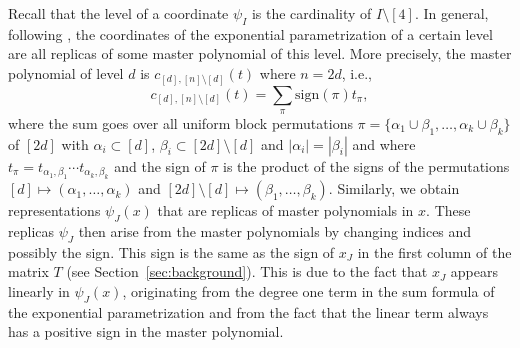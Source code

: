 \documentclass[11pt,reqno]{amsart}
\theoremstyle{definition}
\numberwithin{theorem}{section}
\newcommand{\sign}{\mathrm{sign}}
\numberwithin{equation}{section}
\begin{document}
Recall that the level of a coordinate $\psi_{I}$ is the cardinality of $I \setminus [4]$. In general, following \cite[Theorem 2.5]{faulstich2024algebraic}, the coordinates of the exponential parametrization of a certain level are all replicas of some master polynomial of this level. More precisely, the master polynomial of level $d$ is $c_{[d], [n]\setminus [d]}(t)$ where $n = 2d$, i.e., 
\begin{equation*}
c_{[d], [n]\setminus [d]}(t)= \sum\limits_{\pi} \sign(\pi) t_{\pi},
\end{equation*}
where the sum goes over all uniform block permutations 
$ \pi = \{ \alpha_1 \cup \beta_1, \ldots, \alpha_k \cup \beta_k \}$
of $[2d]$
with $\alpha_i \subset [d]$, $\beta_i \subset [2d] \setminus [d]$ and $|\alpha_i|=|\beta_i|$
and where 
$t_{\pi} = t_{\alpha_1, \beta_1} \cdots t_{\alpha_k ,\beta_k}$ 
and the sign of $\pi$ is the product of the signs of the permutations 
$[d] \mapsto (\alpha_1, \ldots, \alpha_k)$ and $[2d] \setminus [d] \mapsto (\beta_1, \ldots, \beta_k)$. Similarly, we obtain representations $\psi_J(x)$ that are replicas of master polynomials in $x$. These replicas $\psi_J$ 
then arise from the master polynomials by changing indices and possibly the sign. This sign is the same as the sign of 
$x_J$ in the first column of the matrix $T$ (see Section~\ref{sec:background}). This is due to the fact that 
$x_J$ appears linearly in 
$\psi_J(x)$, originating from the degree one term in the sum formula of the exponential parametrization and from the fact that the linear term always has a positive sign in the master polynomial. 
\end{document}
